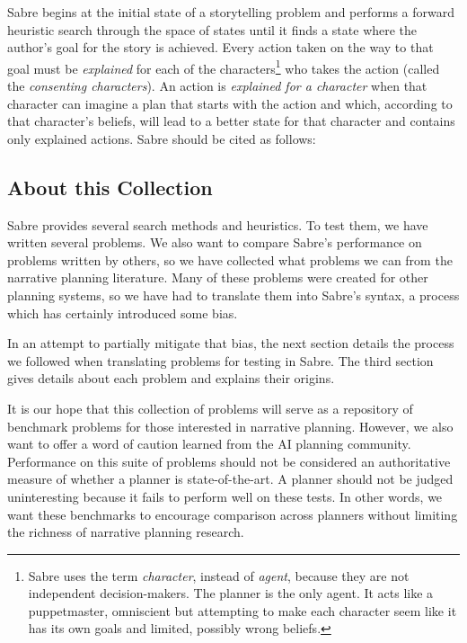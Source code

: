\documentclass{nilreport}
\makeatletter
\renewcommand{\bibentry}[1]{\nocite{#1}{\frenchspacing\@nameuse{BR@r@#1\@extra@b@citeb}}}
\makeatother
\begin{document}
Sabre begins at the initial state of a storytelling problem and performs
a forward heuristic search through the space of states until it finds
a state where the author's goal for the story is achieved. Every action
taken on the way to that goal must be \emph{explained} for each of
the characters\footnote{Sabre uses the term \emph{character}, instead of \emph{agent}, because
they are not independent decision-makers. The planner is the only
agent. It acts like a puppetmaster, omniscient but attempting to make
each character seem like it has its own goals and limited, possibly
wrong beliefs.} who takes the action (called the \emph{consenting characters}). An
action is \emph{explained for a character} when that character can
imagine a plan that starts with the action and which, according to
that character's beliefs, will lead to a better state for that character
and contains only explained actions. Sabre should be cited as follows:

\begin{quote}
	\bibentry{ware2021sabre}
\end{quote}

\subsection{About this Collection}

Sabre provides several search methods and heuristics. To test them,
we have written several problems. We also want to compare Sabre's
performance on problems written by others, so we have collected what
problems we can from the narrative planning literature. Many of these
problems were created for other planning systems, so we have had to
translate them into Sabre's syntax, a process which has certainly
introduced some bias.

In an attempt to partially mitigate that bias, the next section details
the process we followed when translating problems for testing in Sabre.
The third section gives details about each problem and explains their
origins.

It is our hope that this collection of problems will serve as a repository
of benchmark problems for those interested in narrative planning.
However, we also want to offer a word of caution learned from the
AI planning community. Performance on this suite of problems should
not be considered an authoritative measure of whether a planner is
state-of-the-art. A planner should not be judged uninteresting because
it fails to perform well on these tests. In other words, we want these
benchmarks to encourage comparison across planners without limiting
the richness of narrative planning research.
\end{document}
